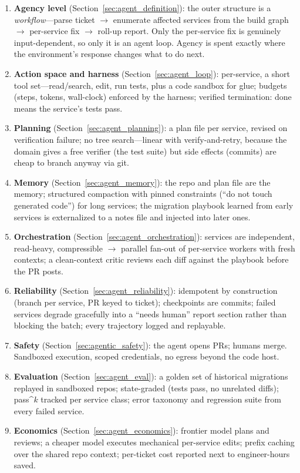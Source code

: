 \begin{enumerate}
    \item \textbf{Agency level} (Section~\ref{sec:agent_definition}): the outer structure is a \textit{workflow}---parse ticket $\rightarrow$ enumerate affected services from the build graph $\rightarrow$ per-service fix $\rightarrow$ roll-up report. Only the per-service fix is genuinely input-dependent, so only it is an agent loop. Agency is spent exactly where the environment's response changes what to do next.
    \item \textbf{Action space and harness} (Section~\ref{sec:agent_loop}): per-service, a short tool set---read/search, edit, run tests, plus a code sandbox for glue; budgets (steps, tokens, wall-clock) enforced by the harness; verified termination: done means the service's tests pass.
    \item \textbf{Planning} (Section~\ref{sec:agent_planning}): a plan file per service, revised on verification failure; no tree search---linear with verify-and-retry, because the domain gives a free verifier (the test suite) but side effects (commits) are cheap to branch anyway via git.
    \item \textbf{Memory} (Section~\ref{sec:agent_memory}): the repo and plan file are the memory; structured compaction with pinned constraints (``do not touch generated code'') for long services; the migration playbook learned from early services is externalized to a notes file and injected into later ones.
    \item \textbf{Orchestration} (Section~\ref{sec:agent_orchestration}): services are independent, read-heavy, compressible $\rightarrow$ parallel fan-out of per-service workers with fresh contexts; a clean-context critic reviews each diff against the playbook before the PR posts.
    \item \textbf{Reliability} (Section~\ref{sec:agent_reliability}): idempotent by construction (branch per service, PR keyed to ticket); checkpoints are commits; failed services degrade gracefully into a ``needs human'' report section rather than blocking the batch; every trajectory logged and replayable.
    \item \textbf{Safety} (Section~\ref{sec:agentic_safety}): the agent opens PRs; humans merge. Sandboxed execution, scoped credentials, no egress beyond the code host.
    \item \textbf{Evaluation} (Section~\ref{sec:agent_eval}): a golden set of historical migrations replayed in sandboxed repos; state-graded (tests pass, no unrelated diffs); pass\textasciicircum{}$k$ tracked per service class; error taxonomy and regression suite from every failed service.
    \item \textbf{Economics} (Section~\ref{sec:agent_economics}): frontier model plans and reviews; a cheaper model executes mechanical per-service edits; prefix caching over the shared repo context; per-ticket cost reported next to engineer-hours saved.
\end{enumerate}

